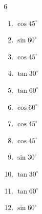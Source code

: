 \begin{multicols}{6}
\begin{enumerate}
  \item $\displaystyle \cos{45^\circ}$


  \item $\displaystyle \sin{60^\circ}$


  \item $\displaystyle \cos{45^\circ}$


  \item $\displaystyle \tan{30^\circ}$


  \item $\displaystyle \tan{60^\circ}$


  \item $\displaystyle \cos{60^\circ}$


  \item $\displaystyle \cos{45^\circ}$


  \item $\displaystyle \cos{45^\circ}$


  \item $\displaystyle \sin{30^\circ}$


  \item $\displaystyle \tan{30^\circ}$


\columnbreak %

  \item $\displaystyle \tan{60^\circ}$


  \item $\displaystyle \sin{60^\circ}$



\end{enumerate}
\end{multicols}

